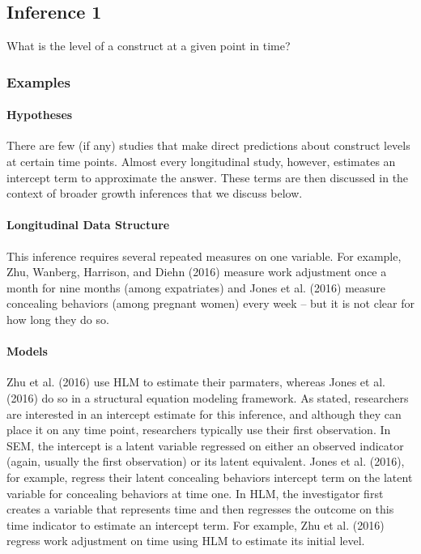 \documentclass[english,,man]{apa6}
\let\oldparagraph\paragraph
\renewcommand{\paragraph}[1]{\oldparagraph{#1}\mbox{}}
\theoremstyle{definition}
\theoremstyle{definition}
\theoremstyle{definition}
\theoremstyle{remark}
\begin{document}
\hypertarget{inference-1-1}{%
\subsection{Inference 1}\label{inference-1-1}}

What is the level of a construct at a given point in time?

\hypertarget{examples-1}{%
\subsubsection{Examples}\label{examples-1}}

\hypertarget{hypotheses-1}{%
\paragraph{Hypotheses}\label{hypotheses-1}}

There are few (if any) studies that make direct predictions about
construct levels at certain time points. Almost every longitudinal
study, however, estimates an intercept term to approximate the answer.
These terms are then discussed in the context of broader growth
inferences that we discuss below.

\hypertarget{longitudinal-data-structure-1}{%
\paragraph{Longitudinal Data
Structure}\label{longitudinal-data-structure-1}}

This inference requires several repeated measures on one variable. For
example, Zhu, Wanberg, Harrison, and Diehn (2016) measure work
adjustment once a month for nine months (among expatriates) and Jones et
al. (2016) measure concealing behaviors (among pregnant women) every
week -- but it is not clear for how long they do so.

\hypertarget{models-1}{%
\paragraph{Models}\label{models-1}}

Zhu et al. (2016) use HLM to estimate their parmaters, whereas Jones et
al. (2016) do so in a structural equation modeling framework. As stated,
researchers are interested in an intercept estimate for this inference,
and although they can place it on any time point, researchers typically
use their first observation. In SEM, the intercept is a latent variable
regressed on either an observed indicator (again, usually the first
observation) or its latent equivalent. Jones et al. (2016), for example,
regress their latent concealing behaviors intercept term on the latent
variable for concealing behaviors at time one. In HLM, the investigator
first creates a variable that represents time and then regresses the
outcome on this time indicator to estimate an intercept term. For
example, Zhu et al. (2016) regress work adjustment on time using HLM to
estimate its initial level.
\end{document}
